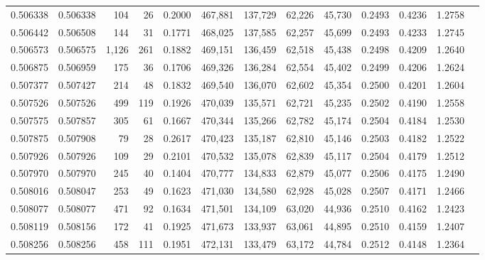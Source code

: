 \begin{tabular}{rrrrrrrrrrrrr}
0.506338 & 0.506338 &   104 &    26 &                                     0.2000 & 467,881 & 137,729 &  62,226 &  45,730 & 0.2493 & 0.4236 & 1.2758 \\
0.506442 & 0.506508 &   144 &    31 &                                     0.1771 & 468,025 & 137,585 &  62,257 &  45,699 & 0.2493 & 0.4233 & 1.2745 \\
0.506573 & 0.506575 & 1,126 &   261 &                                     0.1882 & 469,151 & 136,459 &  62,518 &  45,438 & 0.2498 & 0.4209 & 1.2640 \\
0.506875 & 0.506959 &   175 &    36 &                                     0.1706 & 469,326 & 136,284 &  62,554 &  45,402 & 0.2499 & 0.4206 & 1.2624 \\
0.507377 & 0.507427 &   214 &    48 &                                     0.1832 & 469,540 & 136,070 &  62,602 &  45,354 & 0.2500 & 0.4201 & 1.2604 \\
0.507526 & 0.507526 &   499 &   119 &                                     0.1926 & 470,039 & 135,571 &  62,721 &  45,235 & 0.2502 & 0.4190 & 1.2558 \\
0.507575 & 0.507857 &   305 &    61 &                                     0.1667 & 470,344 & 135,266 &  62,782 &  45,174 & 0.2504 & 0.4184 & 1.2530 \\
0.507875 & 0.507908 &    79 &    28 &                                     0.2617 & 470,423 & 135,187 &  62,810 &  45,146 & 0.2503 & 0.4182 & 1.2522 \\
0.507926 & 0.507926 &   109 &    29 &                                     0.2101 & 470,532 & 135,078 &  62,839 &  45,117 & 0.2504 & 0.4179 & 1.2512 \\
0.507970 & 0.507970 &   245 &    40 &                                     0.1404 & 470,777 & 134,833 &  62,879 &  45,077 & 0.2506 & 0.4175 & 1.2490 \\
0.508016 & 0.508047 &   253 &    49 &                                     0.1623 & 471,030 & 134,580 &  62,928 &  45,028 & 0.2507 & 0.4171 & 1.2466 \\
0.508077 & 0.508077 &   471 &    92 &                                     0.1634 & 471,501 & 134,109 &  63,020 &  44,936 & 0.2510 & 0.4162 & 1.2423 \\
0.508119 & 0.508156 &   172 &    41 &                                     0.1925 & 471,673 & 133,937 &  63,061 &  44,895 & 0.2510 & 0.4159 & 1.2407 \\
0.508256 & 0.508256 &   458 &   111 &                                     0.1951 & 472,131 & 133,479 &  63,172 &  44,784 & 0.2512 & 0.4148 & 1.2364 \\

\end{tabular}
